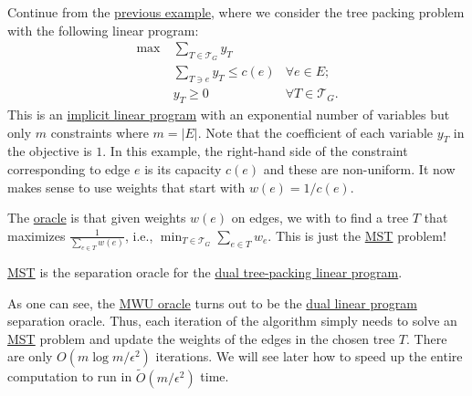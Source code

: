 \begin{eg}
	Continue from the \hyperref[eg:tree-packing-MWU]{previous example}, where we consider the tree packing problem with the following linear program:
	\[
		\begin{aligned}
			\max~ & \sum_{T \in \mathcal{T} _G} y_T                                 \\
			      & \sum_{T \ni e} y_T \leq c(e)    & \forall e \in E ;             \\
			      & y_T \geq 0                      & \forall T \in \mathcal{T} _G.
		\end{aligned}
	\]
	This is an \hyperref[def:implicit-LP]{implicit linear program} with an exponential number of variables but only \(m\) constraints where \(m = \lvert E \rvert \). Note that the coefficient of each variable \(y_T\) in the objective is \(1\). In this example, the right-hand side of the constraint corresponding to edge \(e\) is its capacity \(c(e)\) and these are non-uniform. It now makes sense to use weights that start with \(w(e) = 1 / c(e)\).

	The \hyperref[eq:MWU-oracle-LP]{oracle} is that given weights \(w(e)\) on edges, we with to find a tree \(T\) that maximizes \(\frac{1}{\sum_{e \in T} w(e)}\), i.e., \(\min _{T \in \mathcal{T} _G} \sum_{e \in T} w_e\). This is just the \hyperref[prb:MST]{MST} problem!

	\begin{prev}
		\hyperref[prb:MST]{MST} is the separation oracle for the \hyperref[eq:tree-packing-LP]{dual tree-packing linear program}.
	\end{prev}

	As one can see, the \hyperref[eq:MWU-oracle-LP]{MWU oracle} turns out to be the \hyperref[eq:tree-packing-LP]{dual linear program} separation oracle. Thus, each iteration of the algorithm simply needs to solve an \hyperref[prb:MST]{MST} problem and update the weights of the edges in the chosen tree \(T\). There are only \(O(m \log m / \epsilon ^2)\) iterations. We will see later how to speed up the entire computation to run in \(\widetilde{O} (m / \epsilon ^2)\) time.
\end{eg}

